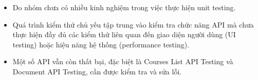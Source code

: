 \begin{itemize}
    \item Do nhóm chưa có nhiều kinh nghiệm trong việc thực hiện unit testing.
    \item Quá trình kiểm thử chủ yếu tập trung vào kiểm tra chức năng API mà chưa thực hiện đầy đủ các kiểm thử liên quan đến giao diện người dùng (UI testing) hoặc hiệu năng hệ thống (performance testing). 
    \item Một số API vẫn còn thất bại, đặc biệt là Courses List API Testing và Document API Testing, cần được kiểm tra và sửa lỗi.
\end{itemize}